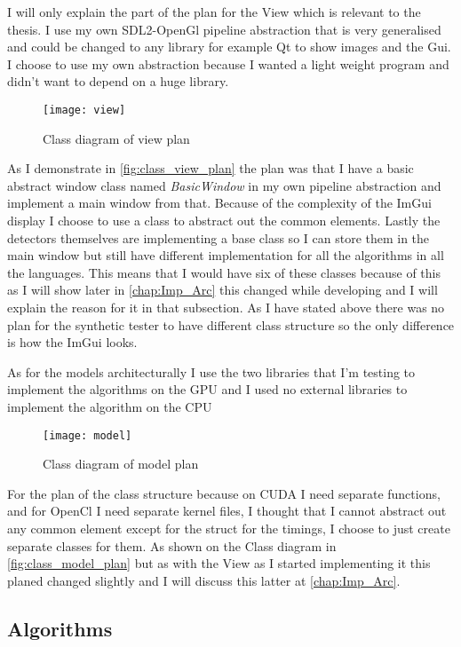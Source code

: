I will only explain the part of the plan for the View which is relevant to the thesis. I use my own \ac{SDL2}-OpenGl pipeline abstraction that is very generalised and could be changed to any library for example Qt to show images and the Gui. I choose to use my own abstraction because I wanted a light weight program and didn't want to depend on a huge library. 

\begin{figure}[H]
\centering
\texttt{[image: view]}
\caption{Class diagram of view plan}
\label{fig:class_view_plan}
\end{figure}

As I demonstrate in \autoref{fig:class_view_plan} the plan was that I have a basic abstract window class named \textit{BasicWindow} in my own pipeline abstraction and implement a main window from that. Because of the complexity of the ImGui display I choose to use a class to abstract out the common elements. Lastly the detectors themselves are implementing a base class so I can store them in the main window but still have different implementation for all the algorithms in all the languages. This means that I would have six of these classes because of this as I will show later in \autoref{chap:Imp_Arc} this changed while developing and I will explain the reason for it in that subsection. As I have stated above there was no plan for the synthetic tester to have different class structure so the only difference is how the ImGui looks.

As for the models architecturally I use the two libraries that I'm testing to implement the algorithms on the \ac{GPU} and I used no external libraries to implement the algorithm on the \ac{CPU}

\begin{figure}[H]
\centering
\texttt{[image: model]}
\caption{Class diagram of model plan}
\label{fig:class_model_plan}
\end{figure}

For the plan of the class structure because on CUDA I need separate functions, and for OpenCl I need separate kernel files, I thought that I cannot abstract out any common element except for the struct for the timings, I choose to just create separate classes for them. As shown on the Class diagram in \autoref{fig:class_model_plan} but as with the View as I started implementing it this planed changed slightly and I will discuss this latter at \autoref{chap:Imp_Arc}.

\subsection{Algorithms}
\label{chap:algo}

